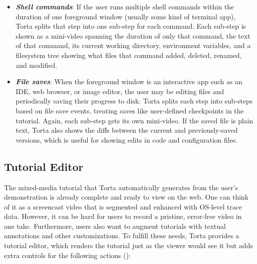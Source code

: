 \begin{itemize}\itemsep0pt

\item \emph{\textbf{Shell commands}}: If the user runs multiple shell commands
within the duration of one foreground window (usually some kind of
terminal app), Torta splits that step into one sub-step for each command.
Each sub-step is shown as a mini-video spanning the duration of only
that command, the text of that command, its current working directory,
environment variables, and a filesystem tree showing what files that
command added, deleted, renamed, and modified.

\item \emph{\textbf{File saves}}: When the foreground window is an
interactive app such as an IDE, web browser, or image editor, the user
may be editing files and periodically saving their progress to disk.
Torta splits each step into sub-steps based on file save events,
treating saves like user-defined checkpoints in the tutorial. Again,
each sub-step gets its own mini-video. If the saved file is plain text,
Torta also shows the diffs between the current and previously-saved
versions, which is useful for showing edits in code and configuration
files. 


\end{itemize}



\subsection{Tutorial Editor}

The mixed-media tutorial that Torta automatically generates from the
user's demonstration is already complete and ready to view on the web.
One can think of it as a screencast video that is segmented and
enhanced with OS-level trace data. However, it can be hard
for users to record a pristine, error-free video in one take.
Furthermore, users also want to augment tutorials with textual
annotations and other customizations. To fulfill these needs, Torta
provides a tutorial editor,
%
which renders the tutorial just as the viewer would see it but
adds extra controls for the following actions ():

